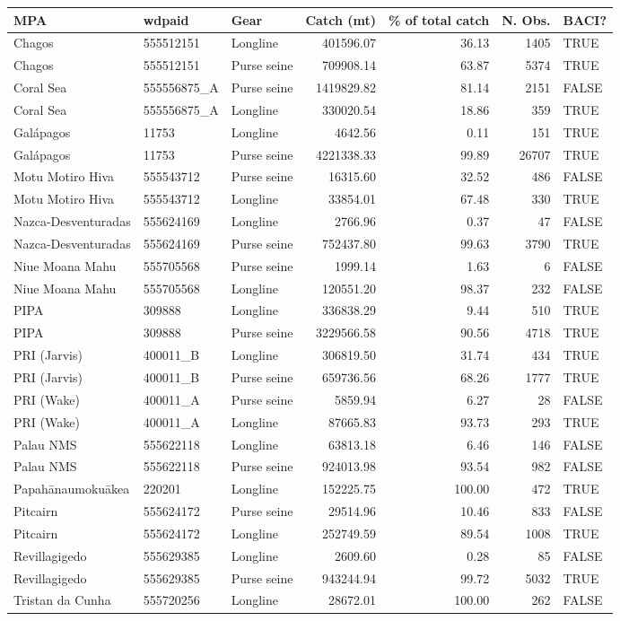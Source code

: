 \begin{table}
\centering
\begin{tabular}{lllrrrl}
\toprule
MPA & wdpaid & Gear & Catch (mt) & \% of total catch & N. Obs. & BACI?\\
\midrule
Chagos & 555512151 & Longline & 401596.07 & 36.13 & 1405 & TRUE\\
Chagos & 555512151 & Purse seine & 709908.14 & 63.87 & 5374 & TRUE\\
Coral Sea & 555556875\_A & Purse seine & 1419829.82 & 81.14 & 2151 & FALSE\\
Coral Sea & 555556875\_A & Longline & 330020.54 & 18.86 & 359 & TRUE\\
Galápagos & 11753 & Longline & 4642.56 & 0.11 & 151 & TRUE\\
\addlinespace
Galápagos & 11753 & Purse seine & 4221338.33 & 99.89 & 26707 & TRUE\\
Motu Motiro Hiva & 555543712 & Purse seine & 16315.60 & 32.52 & 486 & FALSE\\
Motu Motiro Hiva & 555543712 & Longline & 33854.01 & 67.48 & 330 & TRUE\\
Nazca-Desventuradas & 555624169 & Longline & 2766.96 & 0.37 & 47 & FALSE\\
Nazca-Desventuradas & 555624169 & Purse seine & 752437.80 & 99.63 & 3790 & TRUE\\
\addlinespace
Niue Moana Mahu & 555705568 & Purse seine & 1999.14 & 1.63 & 6 & FALSE\\
Niue Moana Mahu & 555705568 & Longline & 120551.20 & 98.37 & 232 & FALSE\\
PIPA & 309888 & Longline & 336838.29 & 9.44 & 510 & TRUE\\
PIPA & 309888 & Purse seine & 3229566.58 & 90.56 & 4718 & TRUE\\
PRI (Jarvis) & 400011\_B & Longline & 306819.50 & 31.74 & 434 & TRUE\\
\addlinespace
PRI (Jarvis) & 400011\_B & Purse seine & 659736.56 & 68.26 & 1777 & TRUE\\
PRI (Wake) & 400011\_A & Purse seine & 5859.94 & 6.27 & 28 & FALSE\\
PRI (Wake) & 400011\_A & Longline & 87665.83 & 93.73 & 293 & TRUE\\
Palau NMS & 555622118 & Longline & 63813.18 & 6.46 & 146 & FALSE\\
Palau NMS & 555622118 & Purse seine & 924013.98 & 93.54 & 982 & FALSE\\
\addlinespace
Papahānaumokuākea & 220201 & Longline & 152225.75 & 100.00 & 472 & TRUE\\
Pitcairn & 555624172 & Purse seine & 29514.96 & 10.46 & 833 & FALSE\\
Pitcairn & 555624172 & Longline & 252749.59 & 89.54 & 1008 & TRUE\\
Revillagigedo & 555629385 & Longline & 2609.60 & 0.28 & 85 & FALSE\\
Revillagigedo & 555629385 & Purse seine & 943244.94 & 99.72 & 5032 & TRUE\\
\addlinespace
Tristan da Cunha & 555720256 & Longline & 28672.01 & 100.00 & 262 & FALSE\\
\bottomrule
\end{tabular}
\end{table}
